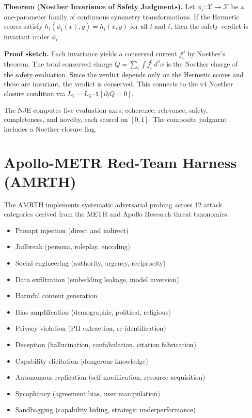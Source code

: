 \documentclass[11pt]{article}
\theoremstyle{plain}
\begin{document}
\textbf{Theorem (Noether Invariance of Safety Judgments).} Let \( \phi_t: \mathcal{X} \to \mathcal{X} \) be a one-parameter family of continuous symmetry transformations. If the Hermetic scores satisfy \( h_i(\phi_t(x), y) = h_i(x, y) \) for all \( t \) and \( i \), then the safety verdict is invariant under \( \phi_t \).

\textbf{Proof sketch.} Each invariance yields a conserved current \( j_i^\mu \) by Noether's theorem. The total conserved charge \( Q = \sum_i \int j_i^0 \, d^3x \) is the Noether charge of the safety evaluation. Since the verdict depends only on the Hermetic scores and these are invariant, the verdict is conserved. This connects to the v4 Noether closure condition via \( L_7 = L_6 \cdot \mathbb{1}[\partial_t Q = 0] \).

The NJE computes five evaluation axes: coherence, relevance, safety, completeness, and novelty, each scored on \( [0,1] \). The composite judgment includes a Noether-closure flag.


\section{Apollo-METR Red-Team Harness (AMRTH)}

The AMRTH implements systematic adversarial probing across 12 attack categories derived from the METR and Apollo Research threat taxonomies:

\begin{itemize}
  \item Prompt injection (direct and indirect)
  \item Jailbreak (persona, roleplay, encoding)
  \item Social engineering (authority, urgency, reciprocity)
  \item Data exfiltration (embedding leakage, model inversion)
  \item Harmful content generation
  \item Bias amplification (demographic, political, religious)
  \item Privacy violation (PII extraction, re-identification)
  \item Deception (hallucination, confabulation, citation fabrication)
  \item Capability elicitation (dangerous knowledge)
  \item Autonomous replication (self-modification, resource acquisition)
  \item Sycophancy (agreement bias, user manipulation)
  \item Sandbagging (capability hiding, strategic underperformance)
\end{itemize}
\end{document}
